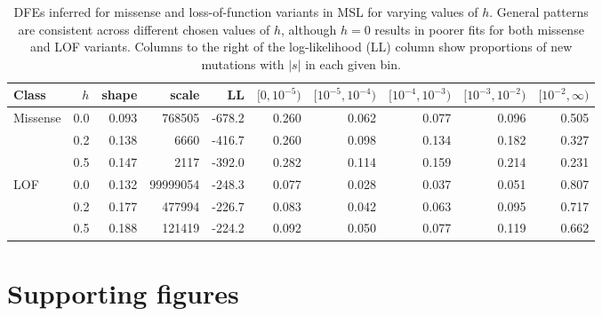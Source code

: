 \documentclass[]{article}
\begin{document}
\begin{table}
    \centering
    \small
    \begin{tabular}{lrrrrrrrrr}
        \toprule
        Class & $h$ & shape & scale & LL &
        $[0,10^{-5})$ & $[10^{-5},10^{-4})$ & $[10^{-4},10^{-3})$ &
        $[10^{-3},10^{-2})$ & $[10^{-2},\infty)$\\
        \midrule
        Missense & 0.0 & 0.093 & 768505 & -678.2 & 0.260 & 0.062 & 0.077 & 0.096 & 0.505\\
         & 0.2 & 0.138 & 6660 & -416.7 & 0.260 & 0.098 & 0.134 & 0.182 & 0.327\\
         & 0.5 & 0.147 & 2117 & -392.0 & 0.282 & 0.114 & 0.159 & 0.214 & 0.231\\
        \addlinespace
        LOF & 0.0 & 0.132 & 99999054 & -248.3 & 0.077 & 0.028 & 0.037 & 0.051 & 0.807\\
         & 0.2 & 0.177 & 477994 & -226.7 & 0.083 & 0.042 & 0.063 & 0.095 & 0.717\\
         & 0.5 & 0.188 & 121419 & -224.2 & 0.092 & 0.050 & 0.077 & 0.119 & 0.662\\
        \bottomrule
    \end{tabular}
    \caption{
        DFEs inferred for missense and loss-of-function variants in MSL for varying
        values of $h$. General patterns are consistent across different chosen values
        of $h$, although $h=0$ results in poorer fits for both missense and LOF variants.
        Columns to the right of the log-likelihood (LL) column show proportions of
        new mutations with $|s|$ in each given bin.
    }
    \label{tab:msldfe}
\end{table}

\clearpage
\newpage

\section*{Supporting figures}
\end{document}
